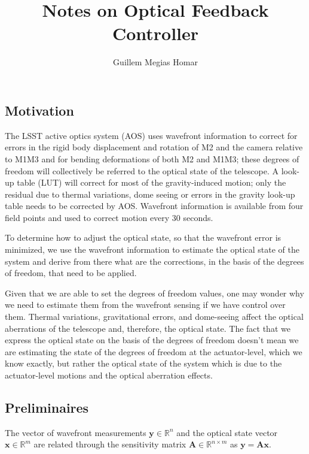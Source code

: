 \documentclass[SE,authoryear,toc]{lsstdoc}
\title{Notes on Optical Feedback Controller}
\author{%
Guillem Megias Homar
}
\date{\vcsDate}
\renewcommand{\v}[1]{\mathbf{#1}}
\begin{document}
\mkshorttitle


\subsection*{Motivation}
The LSST active optics system (AOS) uses wavefront information to correct for errors in the rigid body displacement and rotation of M2 and the camera relative to M1M3 and for bending deformations of both M2 and M1M3; these degrees of freedom will collectively be referred to the optical state of the telescope. A look-up table (LUT) will correct for most of the gravity-induced motion; only the residual due to thermal variations, dome seeing or errors in the gravity look-up table needs to be corrected by AOS. Wavefront information is available from four field points and used to correct motion every 30 seconds. 

To determine how to adjust the optical state, so that the wavefront error is minimized, we use the wavefront information to estimate the optical state of the system and derive from there what are the corrections, in the basis of the degrees of freedom, that need to be applied.

Given that we are able to set the degrees of freedom values, one may wonder why we need to estimate them from the wavefront sensing if we have control over them. Thermal variations, gravitational errors, and dome-seeing affect the optical aberrations of the telescope and, therefore, the optical state. The fact that we express the optical state on the basis of the degrees of freedom doesn't mean we are estimating the state of the degrees of freedom at the actuator-level, which we know exactly, but rather the optical state of the system which is due to the actuator-level motions and the optical aberration effects. 

\subsection*{Preliminaires}
The vector of wavefront measurements $\bm{y} \in \mathbb{R}^n$ and the optical state vector  $\bm{x} \in \mathbb{R}^m$ are related through the sensitivity matrix $\v{A} \in \mathbb{R}^{n \times m}$ as $\bm{y} = \v{A} \bm{x}$. 
\end{document}
